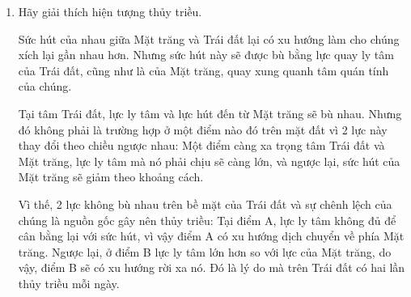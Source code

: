 \begin{enumerate}[label=\bfseries Câu \arabic*:]
{		Như vậy, nguyệt thực chỉ có thể xảy ra vào dịp trăng tròn và khi Mặt Trăng đi qua một số vùng của bóng Trái Đất.
	}
	\item {}
	
	
	{
		Hãy giải thích hiện tượng thủy triều.
	}
	
	\hideall
	{
		Sức hút của nhau giữa Mặt trăng và Trái đất lại có xu hướng làm cho chúng xích lại gần nhau hơn. Nhưng sức hút này sẽ được bù bằng lực quay ly tâm của Trái đất, cũng như là của Mặt trăng, quay xung quanh tâm quán tính của chúng.
		
		Tại tâm Trái đất, lực ly tâm và lực hút đến từ Mặt trăng sẽ bù nhau. Nhưng đó không phải là trường hợp ở một điểm nào đó trên mặt đất vì 2 lực này thay đổi theo chiều ngược nhau: Một điểm càng xa trọng tâm Trái đất và Mặt trăng, lực ly tâm mà nó phải chịu sẽ càng lớn, và ngược lại, sức hút của Mặt trăng sẽ giảm theo khoảng cách.
		
		Vì thế, 2 lực không bù nhau trên bề mặt của Trái đất và sự chênh lệch của chúng là nguồn gốc gây nên thủy triều: Tại điểm A, lực ly tâm không đủ để cân bằng lại với sức hút, vì vậy điểm A có xu hướng dịch chuyển về phía Mặt trăng. Ngược lại, ở điểm B lực ly tâm lớn hơn so với lực của Mặt trăng, do vậy, điểm B sẽ có xu hướng rời xa nó. Đó là lý do mà trên Trái đất có hai lần thủy triều mỗi ngày.
	}
\end{enumerate}